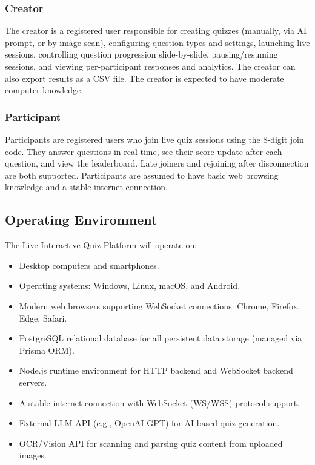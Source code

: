 \documentclass[12pt,a4paper]{article}
\begin{document}
\subsubsection*{Creator}
The creator is a registered user responsible for creating quizzes (manually, via AI
prompt, or by image scan), configuring question types and settings, launching live
sessions, controlling question progression slide-by-slide, pausing/resuming sessions,
and viewing per-participant responses and analytics. The creator can also export
results as a CSV file. The creator is expected to have moderate computer knowledge.

\subsubsection*{Participant}
Participants are registered users who join live quiz sessions using the 8-digit join
code. They answer questions in real time, see their score update after each question,
and view the leaderboard. Late joiners and rejoining after disconnection are both
supported. Participants are assumed to have basic web browsing knowledge and a stable
internet connection.

\subsection{Operating Environment}
The Live Interactive Quiz Platform will operate on:
\begin{itemize}
  \item Desktop computers and smartphones.
  \item Operating systems: Windows, Linux, macOS, and Android.
  \item Modern web browsers supporting WebSocket connections: Chrome, Firefox,
        Edge, Safari.
  \item PostgreSQL relational database for all persistent data storage
        (managed via Prisma ORM).
  \item Node.js runtime environment for HTTP backend and WebSocket backend servers.
  \item A stable internet connection with WebSocket (WS/WSS) protocol support.
  \item External LLM API (e.g., OpenAI GPT) for AI-based quiz generation.
  \item OCR/Vision API for scanning and parsing quiz content from uploaded images.
\end{itemize}
\end{document}
